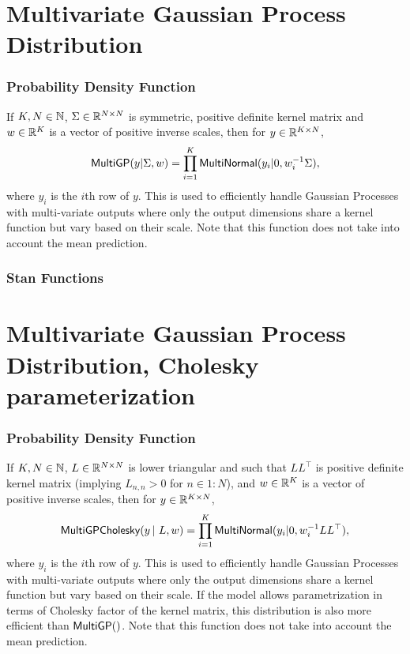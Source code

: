 \section{Multivariate Gaussian Process Distribution}

\subsubsection{Probability Density Function}

If $K,N \in \nats$, $\Sigma \in \reals^{N \times N}$ is symmetric,
positive definite kernel matrix and $w \in \reals^{K}$ is a vector of positive
inverse scales, then for $y \in \reals^{K \times N}$,
\[
\distro{MultiGP}(y|\Sigma,w)
=
\prod_{i=1}^{K} \distro{MultiNormal}(y_i|0,w_i^{-1} \Sigma),
\]
where $y_i$ is the $i$th row of $y$.  This is used to efficiently handle
Gaussian Processes with multi-variate outputs where only the output dimensions
share a kernel function but vary based on their scale.  Note that this
function does not take into account the mean prediction.


\subsubsection{Stan Functions}

\begin{description}
%
%
\end{description}


\section{Multivariate Gaussian Process Distribution, Cholesky parameterization}

\subsubsection{Probability Density Function}

If $K,N \in \nats$, $L \in \reals^{N \times N}$ is lower triangular
and such that $LL^{\top}$ is positive definite kernel matrix (implying
$L_{n,n} > 0$ for $n \in 1{:}N$), and $w \in \reals^{K}$ is a vector
of positive inverse scales, then for $y \in \reals^{K \times N}$,
\[
\distro{MultiGPCholesky}(y \, | \ L,w)
=
\prod_{i=1}^{K} \distro{MultiNormal}(y_i|0,w_i^{-1} LL^{\top}),
\]
where $y_i$ is the $i$th row of $y$.  This is used to efficiently handle
Gaussian Processes with multi-variate outputs where only the output dimensions
share a kernel function but vary based on their scale.  If the model allows
parametrization in terms of Cholesky factor of the kernel matrix, this distribution
is also more efficient than $\distro{MultiGP}()$. Note that this
function does not take into account the mean prediction.

